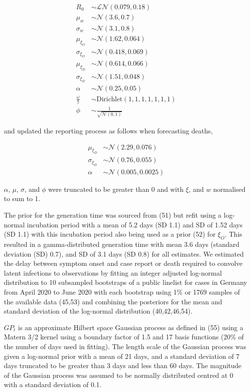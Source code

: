 \documentclass[
]{article}
\begin{document}
\begin{align}
     R_0 &\sim \mathcal{LN}(0.079, 0.18) \\
    \mu_w &\sim \mathcal{N}(3.6, 0.7) \\
    \sigma_w &\sim \mathcal{N}(3.1, 0.8) \\
    \mu_{\xi_{O}} &\sim \mathcal{N}(1.62, 0.064) \\
    \sigma_{\xi_{O}} &\sim \mathcal{N}(0.418, 0.069) \\
    \mu_{\xi_{D}} &\sim \mathcal{N}(0.614, 0.066) \\
    \sigma_{\xi_{D}} &\sim \mathcal{N}(1.51, 0.048) \\
    \alpha &\sim \mathcal{N}(0.25, 0.05) \\
    \frac{\omega}{7} &\sim \mathrm{Dirichlet}(1, 1, 1, 1, 1, 1, 1) \\
    \phi &\sim \frac{1}{\sqrt{\mathcal{N}(0, 1)}}
\end{align}

and updated the reporting process as follows when forecasting deaths,

\begin{align}
    \mu_{\xi_{D}} &\sim \mathcal{N}(2.29, 0.076) \\
    \sigma_{\xi_{D}} &\sim \mathcal{N}(0.76, 0.055) \\
    \alpha &\sim \mathcal{N}(0.005, 0.0025) 
\end{align}

\(\alpha\), \(\mu\), \(\sigma\), and \(\phi\) were truncated to be greater than 0 and with \(\xi\), and \(w\) normalised to sum to 1.

The prior for the generation time was sourced from (51) but refit using a log-normal incubation period with a mean of 5.2 days (SD 1.1) and SD of 1.52 days (SD 1.1) with this incubation period also being used as a prior (52) for \(\xi_{O}\). This resulted in a gamma-distributed generation time with mean 3.6 days (standard deviation (SD) 0.7), and SD of 3.1 days (SD 0.8) for all estimates. We estimated the delay between symptom onset and case report or death required to convolve latent infections to observations by fitting an integer adjusted log-normal distribution to 10 subsampled bootstraps of a public linelist for cases in Germany from April 2020 to June 2020 with each bootstrap using 1\% or 1769 samples of the available data (45,53) and combining the posteriors for the mean and standard deviation of the log-normal distribution (40,42,46,54).

\(GP_t\) is an approximate Hilbert space Gaussian process as defined in (55) using a Matern 3/2 kernel using a boundary factor of 1.5 and 17 basis functions (20\% of the number of days used in fitting). The length scale of the Gaussian process was given a log-normal prior with a mean of 21 days, and a standard deviation of 7 days truncated to be greater than 3 days and less than 60 days. The magnitude of the Gaussian process was assumed to be normally distributed centred at 0 with a standard deviation of 0.1.
\end{document}
